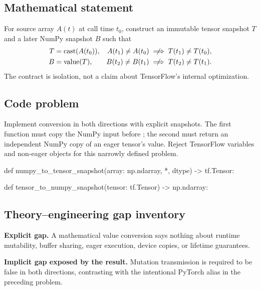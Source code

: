 
        \subsection{Mathematical statement}


For source array $A(t)$ at call time $t_0$, construct an immutable tensor snapshot
$T$ and a later NumPy snapshot $B$ such that
\[
\begin{aligned}
T&=\operatorname{cast}(A(t_0)), & A(t_1)\ne A(t_0)&\centernot\implies T(t_1)\ne T(t_0),\\
B&=\operatorname{value}(T), & B(t_2)\ne B(t_1)&\centernot\implies T(t_2)\ne T(t_1).
\end{aligned}
\]
The contract is isolation, not a claim about TensorFlow's internal optimization.


        \subsection{Code problem}


Implement conversion in both directions with explicit snapshots.  The first
function must copy the NumPy input before ; the
second must return an independent NumPy copy of an eager tensor's value.  Reject
TensorFlow variables and non-eager objects for this narrowly defined problem.


        \begin{contractbox}
        \begin{Code}
        def numpy_to_tensor_snapshot(array: np.ndarray, *, dtype) -> tf.Tensor:

def tensor_to_numpy_snapshot(tensor: tf.Tensor) -> np.ndarray:
        \end{Code}
        \end{contractbox}

        \subsection{Theory--engineering gap inventory}

        \begin{gapbox}
        \textbf{Explicit gap.} A mathematical value conversion says nothing about runtime mutability, buffer sharing, eager execution, device copies, or lifetime guarantees.

        \textbf{Implicit gap exposed by the result.} Mutation transmission is required to be false in both directions, contrasting with the intentional PyTorch alias in the preceding problem.
        \end{gapbox}

